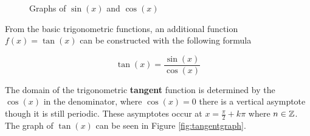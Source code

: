         \medskip

        \begin{figure}
            \centering
            \caption{Graphs of $\sin(x)$ and $\cos(x)$}
            \label{fig:triggraph}
        \end{figure}

        From the basic trigonometric functions, an additional function $f(x) = \tan(x)$ can be constructed with the following formula

        \begin{equation}
            \tan(x) = \frac{\sin(x)}{\cos(x)}
        \end{equation}

        The domain of the trigonometric \textbf{tangent} function is determined by the $\cos(x)$ in the denominator, where $\cos(x) = 0$ there is a vertical asymptote though it is still periodic. These asymptotes occur at $x = \frac{\pi}{2} + k\pi$ where $n \in \mathbb{Z}$. The graph of $\tan(x)$ can be seen in Figure \ref{fig:tangentgraph}.

